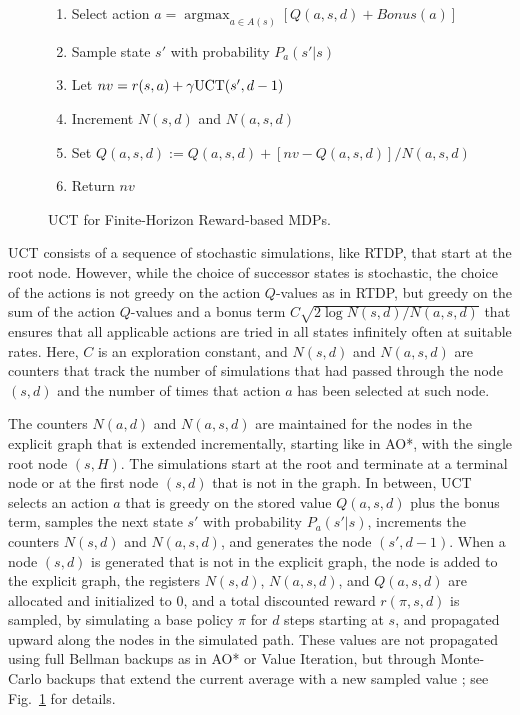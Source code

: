 \documentclass[letterpaper]{article}
\DeclareMathOperator*{\argmax}{argmax}
\begin{document}
\begin{figure}[t]
{{\begin{minipage}{3.9in}
\begin{enumerate}[1.]
\begin{enumerate}[--]
      \item Select action $a = \argmax_{a\in A(s)} [Q(a,s,d) + Bonus(a)]$
      \item Sample state $s'$ with probability $P_{a}(s'|s)$
      \item Let $nv =r(s,a) + \gamma \hbox{UCT}(s',d-1)$
      \item Increment $N(s,d)$ and $N(a,s,d)$
      \item Set $Q(a,s,d):=Q(a,s,d) + [nv - Q(a,s,d)] / N(a,s,d)$
      \item Return $nv$
      \end{enumerate}
    \end{enumerate}
  \end{minipage}}
}
\caption{UCT for Finite-Horizon Reward-based MDPs.}
\label{fig:uct}
\end{figure}

UCT consists of a sequence of stochastic simulations, like RTDP, that start
at the root node. However, while the choice of successor states is stochastic,
the choice of the actions %
is not greedy on the action
$Q$-values as in RTDP, but greedy on the sum of the action $Q$-values and a
bonus term $C\sqrt{2\log N(s,d)/N(a,s,d)}$ that ensures that all applicable
actions are tried in all states infinitely often at suitable rates. 
Here, $C$ is an exploration constant, and $N(s,d)$ and $N(a,s,d)$ are counters
that track the number of simulations that had passed through
the node $(s,d)$ and the number of times that action $a$ has been selected
at such node.

The counters $N(a,d)$ and $N(a,s,d)$ are maintained for the  nodes in the explicit graph 
that is extended incrementally, starting like in   AO*, with the  single root node $(s,H)$. 
The  simulations start  at the root and terminate at a terminal node or at the first node $(s,d)$ 
that is not in the graph. In between, UCT selects an action $a$ that is greedy on the stored value $Q(a,s,d)$ plus the bonus term, 
samples the  next state $s'$ with probability $P_a(s'|s)$, increments the counters $N(s,d)$ and
$N(a,s,d)$, and generates the node $(s',d-1)$. When a node $(s,d)$ is generated that is not in
the explicit graph, the node is added to the explicit graph,  the registers $N(s,d)$, $N(a,s,d)$, 
and $Q(a,s,d)$ are allocated and initialized to $0$, and a total discounted reward $r(\pi,s,d)$ is sampled,
by simulating a base policy $\pi$ for $d$ steps starting at $s$, and  %
propagated upward along the nodes in the simulated path. These values 
are not propagated using full Bellman backups as in AO* or Value Iteration, 
but through Monte-Carlo backups that extend the current average with 
a new sampled value \cite{sutton:book}; see Fig.~\ref{fig:uct} for details.
\end{document}
